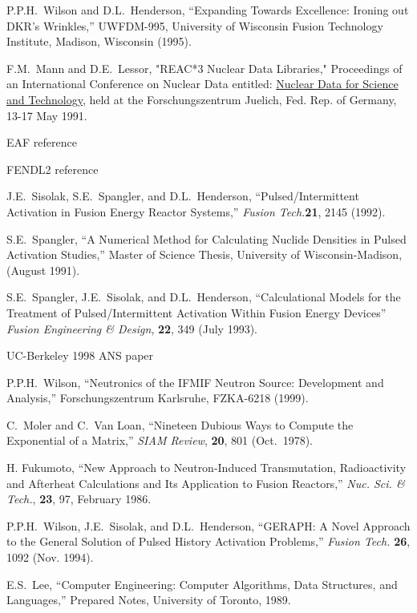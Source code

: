 \begin{thebibliography}{100}
 P.P.H.~Wilson and D.L.~Henderson, ``Expanding Towards
  Excellence: Ironing out DKR's Wrinkles,'' UWFDM-995, University of
  Wisconsin Fusion Technology Institute, Madison, Wisconsin (1995).
  
F.M.~Mann and D.E.~Lessor, "REAC*3 Nuclear Data
  Libraries," Proceedings of an International Conference on Nuclear
  Data entitled: \underline{Nuclear Data for Science and Technology},
  held at the Forschungszentrum Juelich, Fed. Rep. of Germany, 13-17
  May 1991.
  
 EAF reference

 FENDL2 reference

 J.E.~Sisolak, S.E.~Spangler, and D.L.~Henderson,
  ``Pulsed/Intermittent Activation in Fusion Energy Reactor Systems,''
  \textsl{Fusion Tech.}\textbf{21}, 2145 (1992).
  
 S.E.~Spangler, ``A Numerical Method for
  Calculating Nuclide Densities in Pulsed Activation Studies,'' Master
  of Science Thesis, University of Wisconsin-Madison, (August 1991).
  
 S.E.~Spangler, J.E.~Sisolak, and D.L.~Henderson,
  ``Calculational Models for the Treatment of Pulsed/Intermittent
  Activation Within Fusion Energy Devices'' \textsl{Fusion Engineering
    \& Design}, \textbf{22}, 349 (July 1993).

 UC-Berkeley 1998 ANS paper

 P.P.H.~Wilson, ``Neutronics of the IFMIF Neutron
  Source: Development and Analysis,'' Forschungszentrum Karlsruhe,
  FZKA-6218 (1999).
  
 C.~Moler and C.~Van Loan, ``Nineteen Dubious Ways to
  Compute the Exponential of a Matrix,'' \textsl{SIAM
    Review}, \textbf{20}, 801 (Oct.~1978).
  
 H. Fukumoto, ``New Approach to
  Neutron-Induced Transmutation, Radioactivity and Afterheat
  Calculations and Its Application to Fusion Reactors,'' \textsl{Nuc. Sci.
  \& Tech.}, \textbf{23}, 97, February 1986.
  
 P.P.H.~Wilson, J.E.~Sisolak, and D.L.~Henderson,
  ``GERAPH: A Novel Approach to the General Solution of Pulsed History
  Activation Problems,'' \textsl{Fusion Tech.} \textbf{26}, 1092 (Nov.
  1994).
  
 E.S.~Lee, ``Computer Engineering: Computer
  Algorithms, Data Structures, and Languages,'' Prepared Notes,
  University of Toronto, 1989.


\end{thebibliography}
